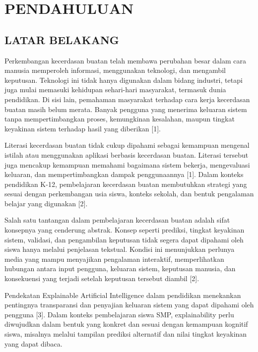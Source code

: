 \documentclass[12pt,oneside]{report}
\begin{document}
\newpage


\chapter{PENDAHULUAN}
\label{chap:bab1}

\section{LATAR BELAKANG}
\label{sec:latar-belakang}

Perkembangan kecerdasan buatan telah membawa perubahan besar dalam cara manusia memperoleh informasi, menggunakan teknologi, dan mengambil keputusan. Teknologi ini tidak hanya digunakan dalam bidang industri, tetapi juga mulai memasuki kehidupan sehari-hari masyarakat, termasuk dunia pendidikan. Di sisi lain, pemahaman masyarakat terhadap cara kerja kecerdasan buatan masih belum merata. Banyak pengguna yang menerima keluaran sistem tanpa mempertimbangkan proses, kemungkinan kesalahan, maupun tingkat keyakinan sistem terhadap hasil yang diberikan [1].

Literasi kecerdasan buatan tidak cukup dipahami sebagai kemampuan mengenal istilah atau menggunakan aplikasi berbasis kecerdasan buatan. Literasi tersebut juga mencakup kemampuan memahami bagaimana sistem bekerja, mengevaluasi keluaran, dan mempertimbangkan dampak penggunaannya [1]. Dalam konteks pendidikan K-12, pembelajaran kecerdasan buatan membutuhkan strategi yang sesuai dengan perkembangan usia siswa, konteks sekolah, dan bentuk pengalaman belajar yang digunakan [2].

Salah satu tantangan dalam pembelajaran kecerdasan buatan adalah sifat konsepnya yang cenderung abstrak. Konsep seperti prediksi, tingkat keyakinan sistem, validasi, dan pengambilan keputusan tidak segera dapat dipahami oleh siswa hanya melalui penjelasan tekstual. Kondisi ini menunjukkan perlunya media yang mampu menyajikan pengalaman interaktif, memperlihatkan hubungan antara input pengguna, keluaran sistem, keputusan manusia, dan konsekuensi yang terjadi setelah keputusan tersebut diambil [2].

Pendekatan Explainable Artificial Intelligence dalam pendidikan menekankan pentingnya transparansi dan penyajian keluaran sistem yang dapat dipahami oleh pengguna [3]. Dalam konteks pembelajaran siswa SMP, explainability perlu diwujudkan dalam bentuk yang konkret dan sesuai dengan kemampuan kognitif siswa, misalnya melalui tampilan prediksi alternatif dan nilai tingkat keyakinan yang dapat dibaca.
\end{document}
